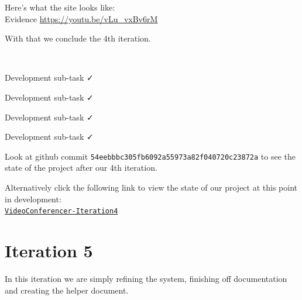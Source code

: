 Here's what the site looks like: \\ \vspace{0.2cm}
{\sffamily Evidence}  \url{https://youtu.be/vLu_vxBv6rM} \\ \vspace{0.2cm}

With that we conclude the 4th iteration. \\ \vspace{0.2cm}

{\color{gray} \hrulefill} \\ \vspace{0.2cm}

{\sffamily Development sub-task } \faCheck \\ \vspace{0.2cm}

{\sffamily Development sub-task } \faCheck \\ \vspace{0.2cm}

{\sffamily Development sub-task } \faCheck \\ \vspace{0.2cm}

{\sffamily Development sub-task } \faCheck \\ \vspace{0.2cm}

Look at github commit \texttt{54eebbbc305fb6092a55973a82f040720c23872a} to see the state
of the project after our 4th iteration. \\ \vspace{0.2cm}

Alternatively click the following link to view the state of our project at this point in
development: \\
\href{https://github.com/zzzNathan/Video-Conferencer/tree/54eebbbc305fb6092a55973a82f040720c23872a}{\texttt{VideoConferencer-Iteration4}}

\section{Iteration 5}

In this iteration we are simply refining the system, finishing off documentation and creating the helper document.
\\ \vspace{0.2cm}
